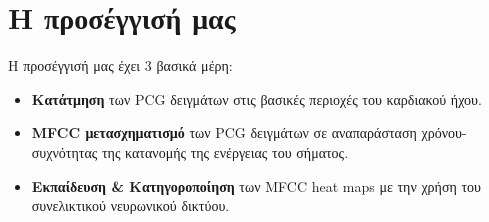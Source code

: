 \section{Η προσέγγισή μας}
\label{our_approach}

Η προσέγγισή μας έχει 3 βασικά μέρη:
\begin{itemize}
    \item \textbf{Κατάτμηση} των PCG δειγμάτων στις βασικές περιοχές του καρδιακού
          ήχου.
    \item \textbf{MFCC μετασχηματισμό} των PCG δειγμάτων σε αναπαράσταση
          χρόνου-συχνότητας της κατανομής της ενέργειας του σήματος.
    \item \textbf{Εκπαίδευση \& Κατηγοροποίηση} των MFCC heat maps με την χρήση
          του συνελικτικού νευρωνικού δικτύου.
\end{itemize}
